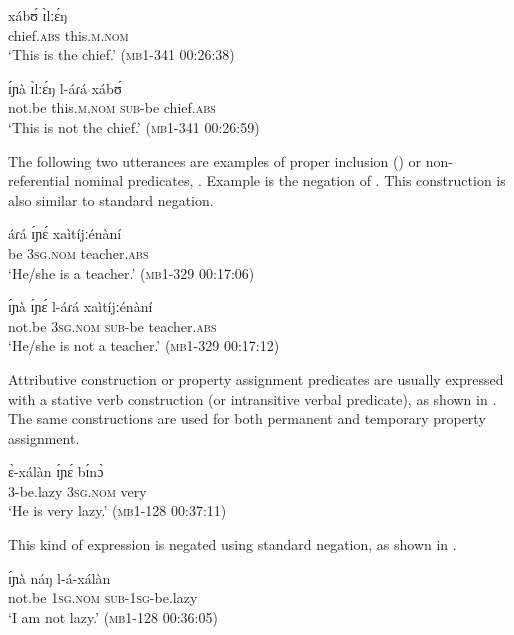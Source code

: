 \documentclass[output=paper,colorlinks,citecolor=brown,draftmode]{langscibook}
\begin{document}
\ea\label{ex:lop:31}
        \gll xábʊ́ ɪ̀lːɛ́ŋ \\ 
             chief\textsc{.abs} this.\textsc{m.nom} \\
        \glt ‘This is the chief.’       (\textsc{mb1-341} 00:26:38)
\z

\ea\label{ex:lop:32}
        \gll ɪ́ɲà ɪ̀lːɛ́ŋ l-áɾá xábʊ́  \\ 
             not.be this.\textsc{m.nom} \textsc{sub-}be chief\textsc{.abs} \\
        \glt ‘This is not the chief.’   (\textsc{mb1-341} 00:26:59)
\z

The following two utterances are examples of proper inclusion (\citealt[114]{Payne1997}) or non-referential nominal predicates, \citep[233]{Dryer2007}.  Example  is the negation of . This construction is also similar to standard negation.

\ea\label{ex:lop:33}
        \gll áɾá ɪ́ɲɛ́ xaìtíjːénàní \\ 
             be 3\textsc{sg.nom} teacher.\textsc{abs} \\
        \glt ‘He/she is a teacher.’    (\textsc{mb1-329} \textsc{00}:17:06)
\z

\ea\label{ex:lop:34}
        \gll ɪ́ɲà ɪ́ɲɛ́ l-áɾá xaìtíjːénàní \\ 
             not.be 3\textsc{sg.nom} \textsc{sub}{}-be teacher.\textsc{abs} \\
        \glt ‘He/she is not a teacher.’    (\textsc{mb1-329} \textsc{00}:17:12)
\z

Attributive construction or property assignment predicates are usually expressed with a stative verb construction (or intransitive verbal predicate), as shown in . The same constructions are used for both permanent and temporary property assignment.

\ea\label{ex:lop:35}
        \gll ɛ̀-xálàn ɪ́ɲɛ́ bɪ́nɔ̀  \\ 
             3-be.lazy 3\textsc{sg.nom} very \\
        \glt ‘He is very lazy.’       (\textsc{mb1-128} \textsc{00:}37:11)
\z

This kind of expression is negated using standard negation, as shown in . 

\ea\label{ex:lop:36}
        \gll ɪ́ɲà náŋ l-á-xálàn  \\ 
             not.be 1\textsc{sg.nom} \textsc{sub-1sg}{}-be.lazy \\
        \glt ‘I am not lazy.’       (\textsc{mb1-128} \textsc{00:}36:05)
\z
\end{document}
